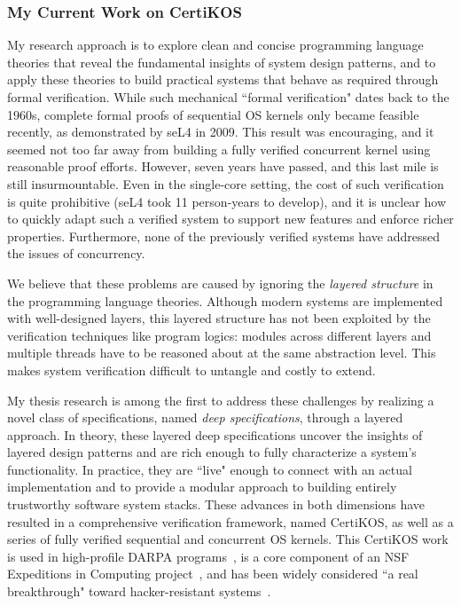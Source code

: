 \documentclass[a4paper, 10pt]{article}
\begin{document}
\begin{small}

\subsubsection*{\large My Current Work on CertiKOS}

My research approach  is to explore clean and concise
programming language theories that 
reveal the fundamental insights of system design patterns,
and to apply these theories
to build practical systems that behave as required
through formal verification. 
While such mechanical ``formal verification" dates back to the 1960s, 
complete formal proofs of sequential OS kernels only became feasible recently, as demonstrated by seL4 in 2009. This result was encouraging, and it seemed not too far away from building a fully verified concurrent kernel using reasonable proof efforts. However, 
seven years have passed, and
this last mile is still insurmountable.
Even in the single-core setting, the cost of such verification is quite prohibitive
(seL4 took 11 person-years to develop), and
 it is unclear how to quickly adapt such a verified system to support new features and enforce richer properties. 
Furthermore, none of the previously verified systems have addressed the
issues of concurrency.

 
We believe that these problems
are caused by ignoring the \emph{layered structure} in the programming language theories.
Although modern systems are implemented with
well-designed layers, this layered structure has not been exploited by the verification techniques like program logics:  modules across different layers and multiple threads have to be reasoned about at 
the same abstraction level. This makes system verification
difficult to untangle
and costly to extend.

My thesis research is among the first to address these challenges
by realizing a novel class of specifications, named \emph{deep specifications}, through a layered approach.
In theory, these layered deep specifications uncover the 
insights of  layered design patterns
and are rich
enough to fully characterize a system's functionality. In practice, they are ``live" enough to  connect   with an actual  implementation and to provide a modular approach to building
entirely trustworthy
 software system stacks.
These advances in both dimensions have resulted in a comprehensive
verification framework, named CertiKOS, as well as
a series of fully verified sequential and concurrent OS kernels.
This CertiKOS work is used in high-profile DARPA programs~\cite{crash,hacms},
is a core component of an NSF Expeditions in Computing project~\cite{deepspec}, and has been widely considered
 ``a real breakthrough" toward hacker-resistant systems~\cite{news, times, dnews}.



\end{small}
\end{document}
